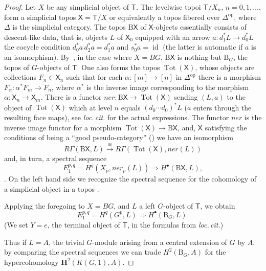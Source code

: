\documentclass{amsart}
\numberwithin{equation}{subsection}
\theoremstyle{remark}
\theoremstyle{remark}
\DeclareMathOperator{\id}{id}
\newcommand{\op}{\mathrm{op}} %
\newcommand{\loccit}{\textit{loc.\,cit.}\xspace}
\newcommand{\too}{\longrightarrow}%
\newcommand{\B}{\mathrm{B}} %
\newcommand{\HH}{\mathbf{H}} %
\newcommand{\iso}{\cong}
\DeclareMathOperator{\Tot}{Tot}
\newcommand{\T}{\mathsf{T}} %
\newcommand{\X}{\mathsf{X}} %
\begin{document}
\begin{proof}
Let $X$ be any simplicial object of $\T$. The levelwise topoi $\T/X_n$, $n=0,1,\dots$, form a simplicial topos $\X=\T/X$ or equivalently a topos fibered over $\Delta^\op$, where $\Delta$ is the simplicial category. The topos $\B\X$ of $\X$-objects essentially consists of descent-like data, that is, objects $L$ of $\X_0$ equipped with an arrow $a\colon d_1^*L\to d_0^*L$ the cocycle condition $d_0^*a\, d_2^*a=d_1^*a$ and $s_0^*a = \id$ (the latter is automatic if $a$ is an isomorphism).
By~\cite[VI.8.1.3]{IllusieII}, in the case where $X=BG$, $\B\X$ is nothing but $\B_G$, the topos of $G$-objects of $\T$. One also forms the topos $\Tot(\X)$, whose objects are collections $F_n\in \X_n$ such that for each $\alpha\colon [m]\to [n]$ in $\Delta^\op$ there is a morphism $F_\alpha\colon \alpha^*F_m\to F_n$, where $\alpha^*$ is the inverse image corresponding to the morphism $\alpha\colon \X_n\to \X_m$. There is a functor $\mathit{ner}\colon \B\X\to \Tot(\X)$ sending $(L,a)$ to the object of $\Tot(\X)$ which at level $n$ equals $(d_0\cdots d_0)^*L$ ($a$ enters through the resulting face maps), see \loccit for the actual expressions. The functor $\mathit{ner}$ is the inverse image functor for a morphism $\Tot(\X)\to \B\X$, and, $\X$ satisfying the conditions of being a ``good pseudo-category'' (\cite[VI 8.2]{IllusieII}) we have an isomorphism
\begin{equation*}
  R\Gamma(\B\X,L) \overset{\iso}{\too} R\Gamma (\Tot(\X),\mathit{ner}(L))
\end{equation*}
and, in turn, a spectral sequence
\begin{equation*}
  E_1^{p,q} = H^q(X_p,\mathit{ner}_p(L)) \Longrightarrow H^\bullet(\B\X, L),
\end{equation*}
\cite[VI, Corollaire 8.4.2.2]{IllusieII}. On the left hand side we recognize the spectral sequence for the cohomology of a simplicial object in a topos \cite[\S 2.10]{Breen}.  

Applying the foregoing to $X=BG$, and $L$ a left $G$-object of $\T$, we obtain \cite[VI.8.4.4.5]{IllusieII}
\begin{equation*}
  E_1^{p,q} = H^q(G^p,L) \Longrightarrow H^\bullet(\B_G, L).
\end{equation*}
(We set $Y=e$, the terminal object of $\T$, in the formulas from \loccit) 

Thus if $L=A$, the trivial $G$-module arising from a central extension of $G$ by $A$, by comparing the spectral sequences we can trade $H^2(\B_G, A)$ for the hypercohomology $\HH^2(K(G,1),A)$. 
\end{proof}
\end{document}
